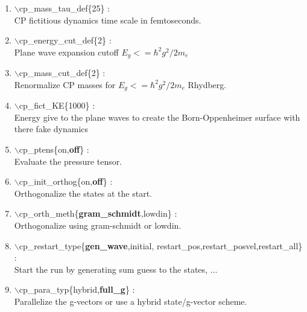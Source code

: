 \begin{itemize}
\begin{enumerate}
 \vspace{0.15in} \Large
 \item  $\backslash$cp\_mass\_tau\_def\{25\} : \\
    \large
      CP fictitious dynamics time scale in femtoseconds.

 \vspace{0.15in} \Large
 \item  $\backslash$cp\_energy\_cut\_def\{2\} : \\
    \large
      Plane wave expansion cutoff $E_g<=\hbar^2g^2/2m_e$ 

 \vspace{0.15in} \Large
 \item  $\backslash$cp\_mass\_cut\_def\{2\} : \\
    \large
      Renormalize CP masses for $E_g<=\hbar^2g^2/2m_e$ Rhydberg.

 \vspace{0.15in} \Large
 \item  $\backslash$cp\_fict\_KE\{1000\} : \\
    \large
      Energy give to the plane waves to create the Born-Oppenheimer
      surface with there fake dynamics

 \vspace{0.15in} \Large
 \item  $\backslash$cp\_ptens\{on,{\bf off}\} : \\
    \large
      Evaluate the pressure tensor. 

 \vspace{0.15in} \Large
 \item  $\backslash$cp\_init\_orthog\{on,{\bf off}\} : \\
    \large
      Orthogonalize the states at the start.

 \vspace{0.15in} \Large
 \item  $\backslash$cp\_orth\_meth\{{\bf gram\_schmidt},lowdin\} : \\
    \large
      Orthogonalize using gram-schmidt or lowdin.

 \vspace{0.15in} \Large
 \item  $\backslash$cp\_restart\_type\{{\bf gen\_wave},initial,
                         restart\_pos,restart\_posvel,restart\_all\} : \\
    \large
      Start the run by generating sum guess to the states, ...

 \vspace{0.15in} \Large
 \item  $\backslash$cp\_para\_typ\{hybrid,{\bf full\_g}\} : \\
    \large
      Parallelize the g-vectors or use a hybrid state/g-vector
      scheme.


\end{enumerate}
\end{itemize}
